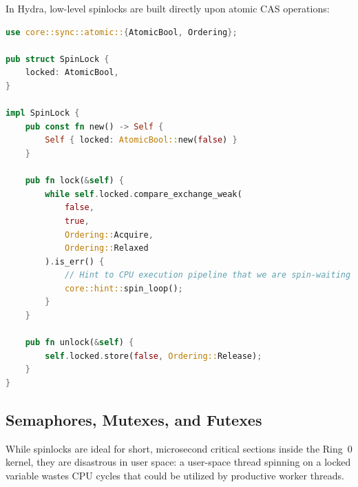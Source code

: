 In Hydra, low-level spinlocks are built directly upon atomic CAS operations:
\begin{lstlisting}[language=Rust, caption={Atomic Spinlock Primitive in Hydra (\texttt{src/sync/mutex.rs})}]
use core::sync::atomic::{AtomicBool, Ordering};

pub struct SpinLock {
    locked: AtomicBool,
}

impl SpinLock {
    pub const fn new() -> Self {
        Self { locked: AtomicBool::new(false) }
    }

    pub fn lock(&self) {
        while self.locked.compare_exchange_weak(
            false,
            true,
            Ordering::Acquire,
            Ordering::Relaxed
        ).is_err() {
            // Hint to CPU execution pipeline that we are spin-waiting
            core::hint::spin_loop();
        }
    }

    pub fn unlock(&self) {
        self.locked.store(false, Ordering::Release);
    }
}
\end{lstlisting}

\subsection{Semaphores, Mutexes, and Futexes}
While spinlocks are ideal for short, microsecond critical sections inside the Ring~0 kernel, they are disastrous in user space: a user-space thread spinning on a locked variable wastes CPU cycles that could be utilized by productive worker threads.

